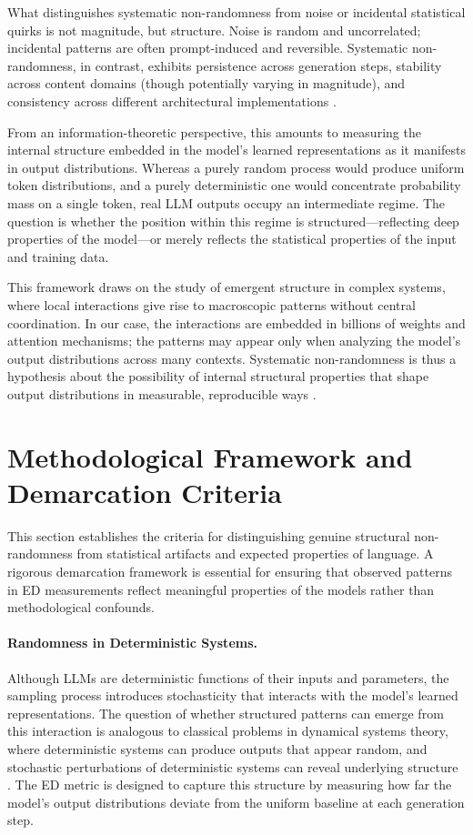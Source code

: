 \documentclass[12pt]{article}
\begin{document}
What distinguishes systematic non-randomness from noise or incidental statistical quirks is not magnitude, but structure. Noise is random and uncorrelated; incidental patterns are often prompt-induced and reversible. Systematic non-randomness, in contrast, exhibits persistence across generation steps, stability across content domains (though potentially varying in magnitude), and consistency across different architectural implementations \citep{perez2022discovering}.

From an information-theoretic perspective, this amounts to measuring the internal structure embedded in the model’s learned representations as it manifests in output distributions. Whereas a purely random process would produce uniform token distributions, and a purely deterministic one would concentrate probability mass on a single token, real LLM outputs occupy an intermediate regime. The question is whether the position within this regime is structured---reflecting deep properties of the model---or merely reflects the statistical properties of the input and training data.

This framework draws on the study of emergent structure in complex systems, where local interactions give rise to macroscopic patterns without central coordination. In our case, the interactions are embedded in billions of weights and attention mechanisms; the patterns may appear only when analyzing the model’s output distributions across many contexts. Systematic non-randomness is thus a hypothesis about the possibility of internal structural properties that shape output distributions in measurable, reproducible ways \citep{elhage2022mechanistic}.

\section{Methodological Framework and Demarcation Criteria}

This section establishes the criteria for distinguishing genuine structural non-randomness from statistical artifacts and expected properties of language. A rigorous demarcation framework is essential for ensuring that observed patterns in ED measurements reflect meaningful properties of the models rather than methodological confounds.

\paragraph{Randomness in Deterministic Systems.}
Although LLMs are deterministic functions of their inputs and parameters, the sampling process introduces stochasticity that interacts with the model's learned representations. The question of whether structured patterns can emerge from this interaction is analogous to classical problems in dynamical systems theory, where deterministic systems can produce outputs that appear random, and stochastic perturbations of deterministic systems can reveal underlying structure \citep{shevlane2023modeling}. The ED metric is designed to capture this structure by measuring how far the model's output distributions deviate from the uniform baseline at each generation step.
\end{document}
